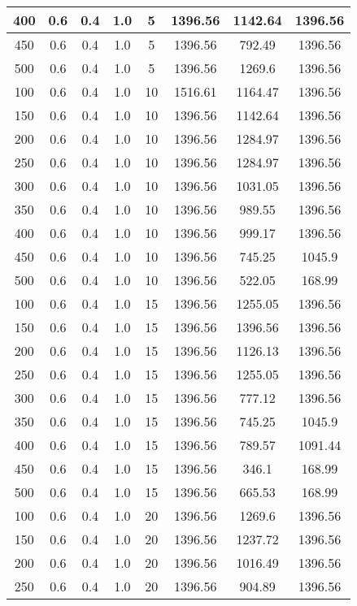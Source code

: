 \documentclass[a4paper, 12pt]{extreport}
\begin{document}
\begin{itemize}
\begin{longtable}{|c|c|c|c|c|c|c|c|}
			400 & 0.6 & 0.4 & 1.0 & 5 & 1396.56 & 1142.64 & 1396.56 \\\hline
			450 & 0.6 & 0.4 & 1.0 & 5 & 1396.56 & 792.49 & 1396.56 \\\hline
			500 & 0.6 & 0.4 & 1.0 & 5 & 1396.56 & 1269.6 & 1396.56 \\\hline
			100 & 0.6 & 0.4 & 1.0 & 10 & 1516.61 & 1164.47 & 1396.56 \\\hline
			150 & 0.6 & 0.4 & 1.0 & 10 & 1396.56 & 1142.64 & 1396.56 \\\hline
			200 & 0.6 & 0.4 & 1.0 & 10 & 1396.56 & 1284.97 & 1396.56 \\\hline
			250 & 0.6 & 0.4 & 1.0 & 10 & 1396.56 & 1284.97 & 1396.56 \\\hline
			300 & 0.6 & 0.4 & 1.0 & 10 & 1396.56 & 1031.05 & 1396.56 \\\hline
			350 & 0.6 & 0.4 & 1.0 & 10 & 1396.56 & 989.55 & 1396.56 \\\hline
			400 & 0.6 & 0.4 & 1.0 & 10 & 1396.56 & 999.17 & 1396.56 \\\hline
			450 & 0.6 & 0.4 & 1.0 & 10 & 1396.56 & 745.25 & 1045.9 \\\hline
			500 & 0.6 & 0.4 & 1.0 & 10 & 1396.56 & 522.05 & 168.99 \\\hline
			100 & 0.6 & 0.4 & 1.0 & 15 & 1396.56 & 1255.05 & 1396.56 \\\hline
			150 & 0.6 & 0.4 & 1.0 & 15 & 1396.56 & 1396.56 & 1396.56 \\\hline
			200 & 0.6 & 0.4 & 1.0 & 15 & 1396.56 & 1126.13 & 1396.56 \\\hline
			250 & 0.6 & 0.4 & 1.0 & 15 & 1396.56 & 1255.05 & 1396.56 \\\hline
			300 & 0.6 & 0.4 & 1.0 & 15 & 1396.56 & 777.12 & 1396.56 \\\hline
			350 & 0.6 & 0.4 & 1.0 & 15 & 1396.56 & 745.25 & 1045.9 \\\hline
			400 & 0.6 & 0.4 & 1.0 & 15 & 1396.56 & 789.57 & 1091.44 \\\hline
			450 & 0.6 & 0.4 & 1.0 & 15 & 1396.56 & 346.1 & 168.99 \\\hline
			500 & 0.6 & 0.4 & 1.0 & 15 & 1396.56 & 665.53 & 168.99 \\\hline
			100 & 0.6 & 0.4 & 1.0 & 20 & 1396.56 & 1269.6 & 1396.56 \\\hline
			150 & 0.6 & 0.4 & 1.0 & 20 & 1396.56 & 1237.72 & 1396.56 \\\hline
			200 & 0.6 & 0.4 & 1.0 & 20 & 1396.56 & 1016.49 & 1396.56 \\\hline
			250 & 0.6 & 0.4 & 1.0 & 20 & 1396.56 & 904.89 & 1396.56 \\\hline

\end{longtable}
\end{itemize}
\end{document}
